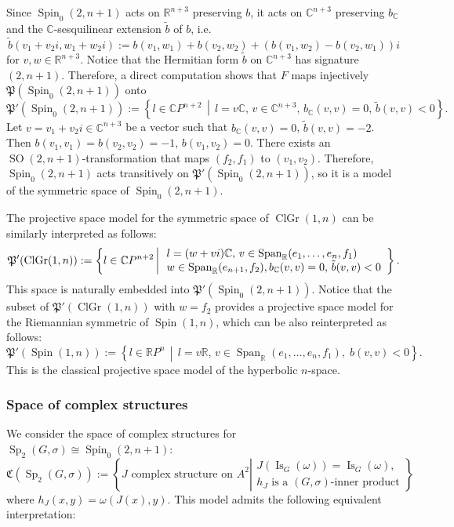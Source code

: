\documentclass[a4paper,oneside,11pt]{amsart}
\DeclareMathOperator{\Span}{Span}
\DeclareMathOperator{\Sp}{Sp}
\DeclareMathOperator{\SO}{SO}
\DeclareMathOperator{\ClGr}{ClGr}
\DeclareMathOperator{\Spin}{Spin}
\DeclareMathOperator{\Is}{Is}
\newcommand{\midwd}{\,\middle\vert\,}
\newcommand{\R}{\mathbb R}
\newcommand{\CC}{\mathbb C}
\theoremstyle{plain}
\theoremstyle{definition}
\theoremstyle{remark}
\begin{document}
Since $\Spin_0(2,n+1)$ acts on $\R^{n+3}$ preserving $b$, it acts on $\CC^{n+3}$ preserving $b_\CC$ and the $\CC$-sesquilinear extension $\tilde b$ of $b$, i.e.
$$\tilde b(v_1+v_2i,w_1+w_2i):=b(v_1,w_1)+b(v_2,w_2)+(b(v_1,w_2)-b(v_2,w_1))i$$
for $v,w\in\R^{n+3}$. Notice that the Hermitian form $\tilde b$ on $\CC^{n+3}$ has signature $(2,n+1)$. Therefore, a direct computation shows that
$F$ maps injectively $\mathfrak P(\Spin_0(2,n+1))$ onto
$$\mathfrak P'(\Spin_0(2,n+1)):=\left\{l\in \CC P^{n+2}\midwd
l=v\CC,\,v\in\CC^{n+3},\,b_\CC(v,v)=0,\,\tilde b(v,v)<0
\right\}.$$
Let $v=v_1+v_2i\in\CC^{n+3}$ be a vector such that $b_\CC(v,v)=0$, $\tilde b(v,v)=-2$. Then $b(v_1,v_1)=b(v_2,v_2)=-1$, $b(v_1,v_2)=0$. There exists an $\SO(2,n+1)$-transformation that maps $(f_2,f_1)$ to $(v_1,v_2)$. Therefore, $\Spin_0(2,n+1)$ acts transitively on $\mathfrak P'(\Spin_0(2,n+1))$, so it is a model of the symmetric space of $\Spin_0(2,n+1)$.

The projective space model for the symmetric space of $\ClGr(1,n)$ can be similarly interpreted as follows:
$$\mathfrak P'(\ClGr(1,n)):=\left\{l\in \CC P^{n+2}\midwd\begin{array}
 ll=(w+vi)\CC,\, v\in\Span_\R(e_1,\dots,e_n,f_1)\\
 w\in\Span_\R(e_{n+1},f_2),
b_\CC(v,v)=0,\,\tilde b(v,v)<0
\end{array}
\right\}.$$
This space is naturally embedded into $\mathfrak P'(\Spin_0(2,n+1))$. Notice that the subset of $\mathfrak P'(\ClGr(1,n))$ with $w=f_2$ provides a projective space model for the Riemannian symmetric of $\Spin(1,n)$, which can be also reinterpreted as follows:
$$\mathfrak P'(\Spin(1,n)):=\left\{l\in \R P^{n}\midwd 
 l=v\R,\, v\in\Span_\R(e_1,\dots,e_n,f_1),\; b(v,v)<0
\right\}.$$
This is the classical projective space model of the hyperbolic $n$-space.


\subsubsection{Space of complex structures}
We consider the space of complex structures for $\Sp_2(G,\sigma)\cong\Spin_0(2,n+1)$:
$$\mathfrak C(\Sp_2(G,\sigma)):=\left\{J\text{ complex structure on $A^2$}\left|\begin{array}{l}
J(\Is_G(\omega))=\Is_G(\omega),\\h_J\text{ is a $(G,\sigma)$-inner product}
\end{array}\right.\right\}$$
where $h_J(x,y)=\omega(J(x),y)$. This model admits the following equivalent interpretation:
\end{document}
